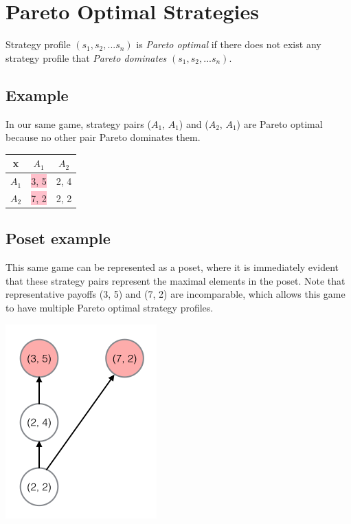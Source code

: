 \documentclass[twoside]{article}
\begin{document}
\section{Pareto Optimal Strategies}
Strategy profile $(s_1, s_2, ...s_n)$ is \emph{Pareto optimal} if there does not exist any strategy profile that \emph{Pareto dominates} $(s_1, s_2, ...s_n)$.

\subsection{Example}
In our same game, strategy pairs ($A_1$, $A_1$) and ($A_2$, $A_1$) are Pareto optimal because no other pair Pareto dominates them. 

\begin{left}
\begin{tabular}{|c|c|c|}
\hline
x & $A_1$ & $A_2$\\
\hline
$A_1$ & \colorbox{pink}{3, 5} & 2, 4\\
\hline
$A_2$ & \colorbox{pink}{7, 2} & 2, 2\\
\hline
\end{tabular}
\end{left}

\subsection{Poset example}

This same game can be represented as a poset, where it is immediately evident that these strategy pairs represent the maximal elements in the poset. Note that representative payoffs (3, 5) and (7, 2) are incomparable, which allows this game to have multiple Pareto optimal strategy profiles.

\includegraphics{poset.png}
\end{document}

